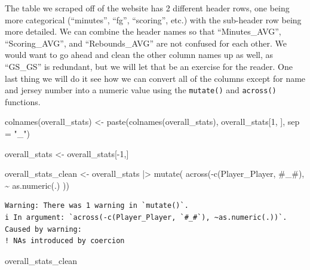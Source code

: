 \documentclass[
  letterpaper,
  DIV=11,
  numbers=noendperiod]{scrreprt}
\newenvironment{Shaded}{\begin{snugshade}}{\end{snugshade}}
\newcommand{\AttributeTok}[1]{\textcolor[rgb]{0.40,0.45,0.13}{#1}}
\newcommand{\DecValTok}[1]{\textcolor[rgb]{0.68,0.00,0.00}{#1}}
\newcommand{\FunctionTok}[1]{\textcolor[rgb]{0.28,0.35,0.67}{#1}}
\newcommand{\NormalTok}[1]{\textcolor[rgb]{0.00,0.23,0.31}{#1}}
\newcommand{\OtherTok}[1]{\textcolor[rgb]{0.00,0.23,0.31}{#1}}
\newcommand{\SpecialCharTok}[1]{\textcolor[rgb]{0.37,0.37,0.37}{#1}}
\newcommand{\StringTok}[1]{\textcolor[rgb]{0.13,0.47,0.30}{#1}}
\begin{document}
The table we scraped off of the website has 2 different header rows, one
being more categorical (``minutes'', ``fg'', ``scoring'', etc.) with the
sub-header row being more detailed. We can combine the header names so
that ``Minutes\_AVG'', ``Scoring\_AVG'', and ``Rebounds\_AVG'' are not
confused for each other. We would want to go ahead and clean the other
column names up as well, as ``GS\_GS'' is redundant, but we will let
that be an exercise for the reader. One last thing we will do it see how
we can convert all of the columns except for name and jersey number into
a numeric value using the \texttt{mutate()} and \texttt{across()}
functions.

\begin{Shaded}
\begin{Highlighting}[]
\FunctionTok{colnames}\NormalTok{(overall\_stats) }\OtherTok{\textless{}{-}} \FunctionTok{paste}\NormalTok{(}\FunctionTok{colnames}\NormalTok{(overall\_stats), overall\_stats[}\DecValTok{1}\NormalTok{, ], }\AttributeTok{sep =} \StringTok{"\_"}\NormalTok{)}

\NormalTok{overall\_stats }\OtherTok{\textless{}{-}}\NormalTok{ overall\_stats[}\SpecialCharTok{{-}}\DecValTok{1}\NormalTok{,]}

\NormalTok{overall\_stats\_clean }\OtherTok{\textless{}{-}}\NormalTok{ overall\_stats }\SpecialCharTok{|\textgreater{}} 
  \FunctionTok{mutate}\NormalTok{( }\FunctionTok{across}\NormalTok{(}\SpecialCharTok{{-}}\FunctionTok{c}\NormalTok{(Player\_Player, }\StringTok{\textasciigrave{}}\AttributeTok{\#\_\#}\StringTok{\textasciigrave{}}\NormalTok{), }\SpecialCharTok{\textasciitilde{}} \FunctionTok{as.numeric}\NormalTok{(.) ))}
\end{Highlighting}
\end{Shaded}

\begin{verbatim}
Warning: There was 1 warning in `mutate()`.
i In argument: `across(-c(Player_Player, `#_#`), ~as.numeric(.))`.
Caused by warning:
! NAs introduced by coercion
\end{verbatim}

\begin{Shaded}
\begin{Highlighting}[]
\NormalTok{overall\_stats\_clean}
\end{Highlighting}
\end{Shaded}
\end{document}
